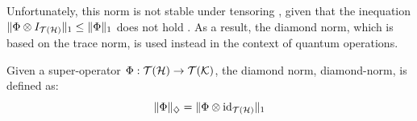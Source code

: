 

Unfortunately, this norm is not stable under tensoring , given that the inequation $ \lVert \Phi \otimes I_{\mathcal{T}(\mathcal{H})} \rVert_{1} \leq \lVert \Phi \rVert_{1}$ does not hold \cite{watrous2018theory}. As a result, the diamond norm, which is based on the trace norm, is used instead in the context of quantum operations. 
\begin{definition} \label{def:diamond_norm}
  Given a super-operator $\Phi: \mathcal{T}(\mathcal{H}) \to \mathcal{T}(\mathcal{K})$, the diamond norm, \gls{diamond-norm}, is defined as:
  \begin{equation*}  \label{eq:diamond_distance}
    \lVert \Phi \rVert_{\diamondsuit} =  \lVert \Phi \otimes \mathrm{id}_{\mathcal{T}(\mathcal{H})} \rVert_{1}
  \end{equation*}
\end{definition}




